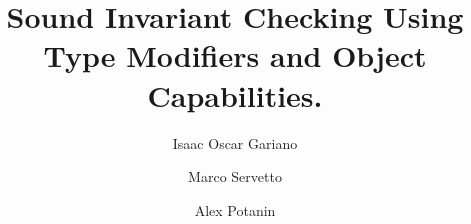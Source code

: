 \documentclass[a4paper,UKenglish,cleveref, autoref]{lipics-v2019}
\title{Sound Invariant Checking Using Type Modifiers and Object Capabilities.}
\author{Isaac Oscar Gariano}{Victoria University of Wellington, New Zealand}{isaac@ecs.vuw.ac.nz}{}{}
\author{Marco Servetto}{Victoria University of Wellington, New Zealand}{marco.servetto@ecs.vuw.ac.nz}{}{}
\author{Alex Potanin}{Victoria University of Wellington, New Zealand}{alex@ecs.vuw.ac.nz}{}{}
\begin{document}
\maketitle

\begin{abstract}

\end{abstract}


\end{document}
